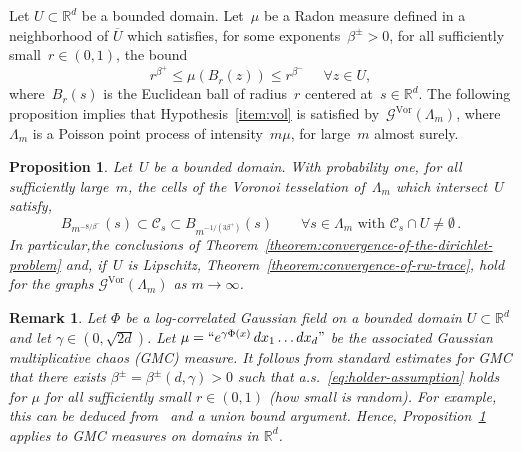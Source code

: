 \documentclass[12pt]{amsart}
\numberwithin{equation}{section}
\newtheorem{prop}[theorem]{Proposition}
\newtheorem{remark}[theorem]{Remark}
\newcommand*{\Rd}{\ensuremath{\mathbb{R}^d}}
\newcommand{\GVor}{\mathcal{G}^{\mathrm{Vor}}}
\begin{document}
Let $U\subset \Rd$ be a bounded domain. Let~$\mu$ be a Radon measure defined in a neighborhood of $\overline U$
which satisfies, for some exponents~$\beta^{\pm} > 0$, for all sufficiently small~$r \in (0,1)$, the bound 
\begin{equation}
	\label{eq:holder-assumption}
	r^{\beta^{+}} \leq \mu(B_r(z)) \leq r^{\beta^{-}} \,  \ \quad \forall z \in U , 
\end{equation}
	where~$B_r(s)$ is the Euclidean ball of radius~$r$ centered at~$s \in \Rd$. 
The following proposition implies that Hypothesis~\ref{item:vol} is satisfied  by~$\GVor(\Lambda_m)$,
where~$\Lambda_m$ is a Poisson point process of intensity~$m \mu$, for large~$m$ almost surely.
\begin{prop}
	\label{prop:min-max-edge-length}
	Let~$U$ be a bounded domain.
	With probability one, for all sufficiently large~$m$, the cells of the Voronoi tesselation of~$\Lambda_m$
	which intersect~$U$ satisfy, 
	\begin{equation}
		\label{eq:cells-are-contained-in-balls}
	B_{m^{-8/\beta^-}}(s) \subset \mathcal{C}_s \subset B_{m^{-1/(3\beta^+)}}(s) \qquad \forall s \in \Lambda_m  \mbox{ with~$\mathcal{C}_s \cap U \neq \emptyset$} \, .
	\end{equation}
	In particular,the conclusions of Theorem~\ref{theorem:convergence-of-the-dirichlet-problem} and, if~$U$ is Lipschitz, Theorem~\ref{theorem:convergence-of-rw-trace}, hold for the graphs $\GVor(\Lambda_m)$ as $m\to\infty$.
\end{prop}



\begin{remark} \label{remark:gmc}
	Let $\Phi$ be a log-correlated Gaussian field on a bounded domain $U \subset \Rd$ and let $\gamma \in (0,\sqrt{2d})$. Let $\mu = ``e^{\gamma \Phi(x)} \,dx_1\dots dx_d"$ be the associated Gaussian multiplicative chaos (GMC) measure. It follows from standard estimates for GMC that there exists $\beta^\pm = \beta^\pm(d,\gamma)> 0$ such that a.s.~\eqref{eq:holder-assumption} holds for $\mu$ for all sufficiently small $r\in (0,1)$ (how small is random). For example, this can be deduced from~\cite[Theorem 3.26]{berestycki2024gaussian} and a union bound argument. Hence, Proposition~\ref{prop:min-max-edge-length} applies to GMC measures on domains in $\Rd$.
\end{remark}
\end{document}

